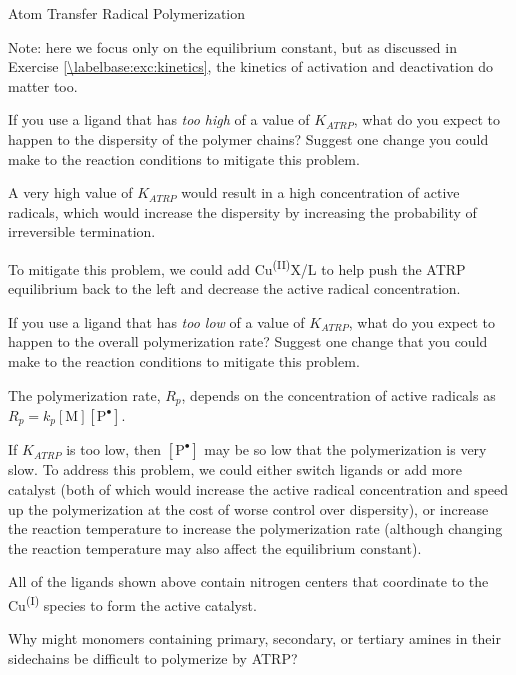 \begin{activity}{Atom Transfer Radical Polymerization}
\begin{ctqs}
\begin{solution}[1.25in]
{		Note: here we focus only on the equilibrium constant, but as discussed in Exercise \ref{\labelbase:exc:kinetics}, the kinetics of activation and deactivation do matter too.}
		\studentdisplay{}
		\end{solution}
	
	\question If you use a ligand that has \emph{too high} of a value of $K_{ATRP}$, what do you expect to happen to the dispersity of the polymer chains?  Suggest one change you could make to the reaction conditions to mitigate this problem.
	
		\begin{solution}[1.25in]
			A very high value of $K_{ATRP}$ would result in a high concentration of active radicals, which would increase the dispersity by increasing the probability of irreversible termination.
			
			To mitigate this problem, we could add Cu\textsuperscript{(II)}X/L to help push the ATRP equilibrium back to the left and decrease the active radical concentration.
		\end{solution}
	
	\question If you use a ligand that has \emph{too low} of a value of $K_{ATRP}$, what do you expect to happen to the overall polymerization rate?  Suggest one change that you could make to the reaction conditions to mitigate this problem. \label{\labelbase:ctq:lowK}
	
		\begin{solution}[1.25in]
			The polymerization rate, $R_p$, depends on the concentration of active radicals as $R_p = k_p[\text{M}][\text{P}^\bullet]$.
			
			If $K_{ATRP}$ is too low, then $[\text{P}^\bullet]$ may be so low that the polymerization is very slow.  To address this problem, we could either switch ligands or add more catalyst (both of which would increase the active radical concentration and speed up the polymerization at the cost of worse control over dispersity), or increase the reaction temperature to increase the polymerization rate (although changing the reaction temperature may also affect the equilibrium constant).
		\end{solution}
	
	\question All of the ligands shown above contain nitrogen centers that coordinate to the Cu\textsuperscript{(I)} species to form the active catalyst.
	
		Why might monomers containing primary, secondary, or tertiary amines in their sidechains be difficult to polymerize by ATRP?  
	

\end{ctqs}
\end{activity}
